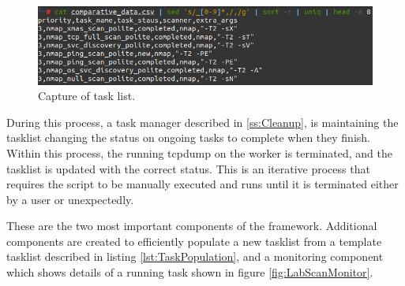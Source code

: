 \begin{figure}[htbp]
\centerline{\includegraphics[scale=0.5]{images/lab/tasklist.png}}
\caption{Capture of task list.}
\label{fig:LabTasklist}
\end{figure}

During this process, a task manager described in \ref{ss:Cleanup}, is maintaining the tasklist changing the status on ongoing tasks to complete when they finish.
Within this process, the running tcpdump on the worker is terminated, and the tasklist is updated with the correct status.
This is an iterative process that requires the script to be manually executed and runs until it is terminated either by a user or unexpectedly.

These are the two most important components of the framework.
Additional components are created to efficiently populate a new tasklist from a template tasklist described in listing \ref{lst:TaskPopulation}, and a monitoring component which shows details of a running task shown in figure \ref{fig:LabScanMonitor}.
